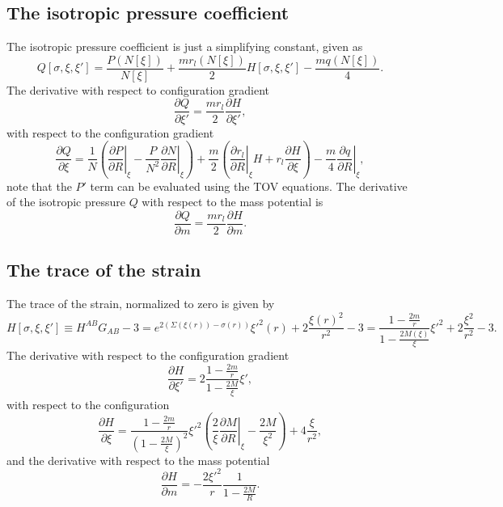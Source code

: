 \subsection{The isotropic pressure coefficient}
The isotropic pressure coefficient is just a simplifying constant, given as
\begin{equation}
Q[\sigma,\xi,\xi'] = \frac{P(N[\xi])}{N[\xi]} +
\frac{mr_l\left(N[\xi]\right)}{2}H[\sigma,\xi,\xi']-\frac{mq\left(N[\xi]\right)}{4}.
\label{eq:pressureQExpanded}
\end{equation}
The derivative with respect to configuration gradient
\begin{equation}
\frac{\partial Q}{\partial \xi'} = \frac{mr_l}{2}\frac{\partial H}{\partial \xi'},
\label{eq:dpressureQ:dxi}
\end{equation}
with respect to the configuration gradient
\begin{equation}
\frac{\partial Q}{\partial \xi} = \frac{1}{N}\left( \left.\frac{\partial P}{\partial R}\right|_\xi - \frac{P}{N^2}\left.\frac{\partial N}{\partial R}\right|_\xi \right)
+\frac{m}{2}\left(\left.\frac{\partial r_l}{\partial R}\right|_\xi H + r_l\frac{\partial H}{\partial \xi}\right) - \frac{m}{4}\left.\frac{\partial q}{\partial R}\right|_\xi,
\label{eq:dpressureQ:xi}
\end{equation}
note that the $P'$ term can be evaluated using the TOV equations. The derivative of the isotropic pressure $Q$ with respect to the mass potential is
\begin{equation}
\frac{\partial Q}{\partial m} = \frac{mr_l}{2}\frac{\partial H}{\partial m}.
\label{eq:dpressureQ:m}
\end{equation}

\subsection{The trace of the strain}
The trace of the strain, normalized to zero is given by
\begin{equation}
H[\sigma,\xi,\xi']\equiv H^{AB}G_{AB} -3= e^{2(\Sigma(\xi(r))-\sigma(r))}\xi'^2(r) +
2\frac{\xi(r)^2}{r^2} - 3 = \frac{1 - \frac{2m}{r}}{1 - \frac{2M(\xi)}{\xi}}\xi'^2 + 2\frac{\xi^2}{r^2} - 3.
\label{eq:traceExpanded}
\end{equation}
The derivative with respect to the configuration gradient
\begin{equation}
\frac{\partial H}{\partial \xi'} = 2\frac{1 - \frac{2m}{r}}{1 - \frac{2M}{\xi}}\xi',
\label{eq:dtrace:dxi}
\end{equation}
with respect to the configuration
\begin{equation}
\frac{\partial H}{\partial \xi} = \frac{1 - \frac{2m}{r}}{\left(1 - \frac{2M}{\xi}\right)^2}\xi'^2\left(\frac{2}{\xi}\left.\frac{\partial M}{\partial R}\right|_\xi - \frac{2M}{\xi^2}\right) + 4\frac{\xi}{r^2},
\label{eq:dtrace:xi}
\end{equation}
and the derivative with respect to the mass potential
\begin{equation}
\frac{\partial H}{\partial m} = -\frac{2\xi'^2}{r}\frac{1}{1 - \frac{2M}{R}}.
\label{eq:dtrace:m}
\end{equation}